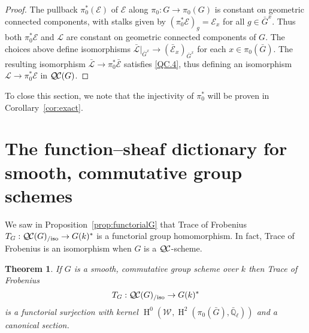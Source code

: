 \documentclass{amsart}
\theoremstyle{plain}
\newtheorem{theorem}{Theorem}[section]
\theoremstyle{definition}
\theoremstyle{remark}
\newcommand{\EE}{\mathbb{\bar Q}_\ell}
\newcommand{\Fq}{k}
\newcommand{\Weil}[1]{\mathcal{W}_{#1}}
\DeclareMathOperator{\Hh}{H}
\newcommand{\qcs}[1]{{\mathcal{#1}}}
\newcommand{\gqcs}[1]{{\mathcal{\bar #1}}}
\newcommand{\QC}{{\mathcal{Q\hskip-0.8pt C}}}
\newcommand{\QCiso}[1]{\QC(#1)_{/\text{iso}}}
\newcommand{\TrFrob}[1]{T_{#1}}
\newcommand{\bG}{\bar{G}}
\begin{document}
\begin{proof}
The pullback $\pi_0^*(\qcs{E})$ of $\qcs{E}$ along $\pi_0 : G \to \pi_0(G)$ is constant
on geometric connected components, with stalks given by
$(\pi_0^* \qcs{E})_g = \qcs{E}_{x}$ for all $g\in \bG^x$.  Thus both $\pi_0^*\qcs{E}$ and $\qcs{L}$
are constant on geometric connected components of $G$.
The choices above define isomorphisms
$\gqcs{L}\vert_{\bG^x} \to  (\gqcs{E}_{x})_{\bG^x}$ for each $x\in \pi_0(\bG)$.
The resulting isomorphism $\gqcs{L} \to \pi_0^* \gqcs{E}$ satisfies \ref{QC.4},
thus defining an isomorphism $\qcs{L} \to \pi_0^* \qcs{E}$ in $\QC(G)$.
\end{proof}

To close this section, we note that the injectivity of $\pi_0^*$ will be proven in Corollary~\ref{cor:exact}.

\section{The function--sheaf dictionary for smooth, commutative group schemes}
\label{sec:snake}

We saw in Proposition~\ref{prop:functorialG} that Trace of Frobenius
$\TrFrob{G} : \QCiso{G} \to G(\Fq)^*$ is a functorial group homomorphism.
In fact, Trace of Frobenius is an isomorphism when $G$ is a $\QC$-scheme.

\begin{theorem}\label{thm:snake}
  If $G$ is a smooth, commutative group scheme over
  $\Fq$ then Trace of Frobenius
  \[
  \TrFrob{G} : \QCiso{G} \to G(\Fq)^*
  \]
  is a functorial surjection with kernel $\Hh^0(\Weil{}, \Hh^2(\pi_0({\bar G}), \EE))$ and a canonical section.
\end{theorem}
\end{document}
